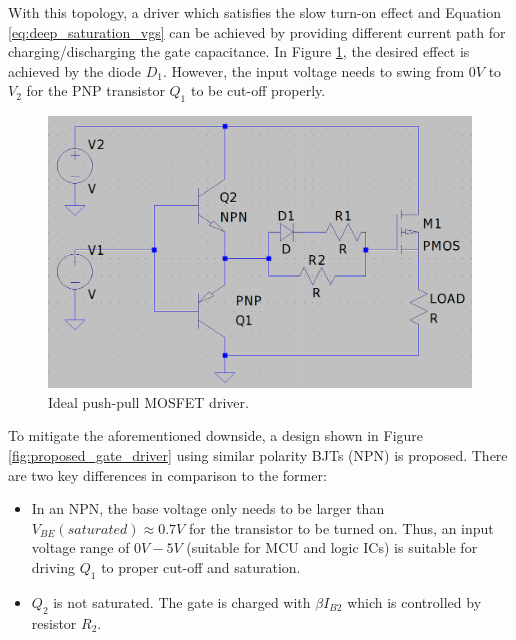 \documentclass[../main.tex]{subfiles}
\begin{document}
    \justify
    With this topology, a driver which satisfies the slow turn-on effect and Equation \eqref{eq:deep_saturation_vgs} can be achieved by providing different current path for charging/discharging the gate capacitance. In Figure \ref{fig:ideal_totem_pole_mod}, the desired effect is achieved by the diode $D_1$. However, the input voltage needs to swing from $0V$ to $V_2$ for the PNP transistor $Q_1$ to be cut-off properly.

    \begin{figure}[!h]
        \centerline{\includegraphics[scale=0.25]{media/ideal_totem_pole_mod.png}}
        \caption{Ideal push-pull MOSFET driver.}
        \label{fig:ideal_totem_pole_mod}
    \end{figure}

    \justify
    To mitigate the aforementioned downside, a design shown in Figure \ref{fig:proposed_gate_driver} using similar polarity BJTs (NPN) is proposed. There are two key differences in comparison to the former:
    \begin{itemize}
        \item  In an NPN, the base voltage only needs to be larger than $V_{BE}(saturated)\approx 0.7V$ for the transistor to be turned on. Thus, an input voltage range of $0V - 5V$ (suitable for MCU and logic ICs) is suitable for driving $Q_1$ to proper cut-off and saturation.
        \item $Q_2$ is not saturated. The gate is charged with $\beta I_{B2}$ which is controlled by resistor $R_2$.
    \end{itemize}
\end{document}
